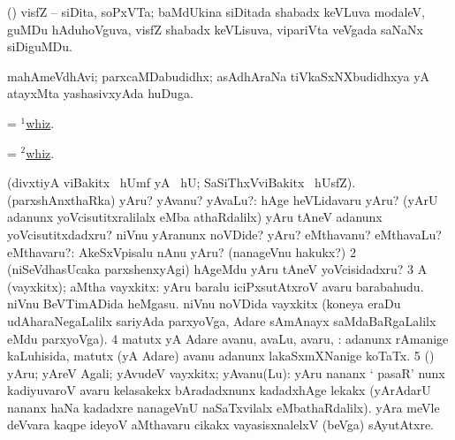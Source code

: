 \bentry
{}
\gl{\nA}
\bmng
(\AmA) visfZ -- siDita, soPxVTa; baMdUkina siDitada shabadx keVLuva modaleV, guMDu hAduhoVguva, visfZ shabadx keVLisuva, vipariVta veVgada saNaNx siDiguMDu. 
\emng
\eentry

\bentry
{}
\gl{\nA}
\bmng
mahAmeVdhAvi; parxcaMDabudidhx; asAdhAraNa tiVkaSxNXbudidhxya yA atayxMta yashasivxyAda huDuga. 
\emng
\eentry

\bentry
{} 
\gl{\nA}
\expl{}
\bmng
= \hyperlink{whiz(1)}{$^1$whiz}. 
\emng
\eentry

\bentry
{} 
\gl{\akirx}
\bmng
= \hyperlink{whiz(2)}{$^2$whiz}. 
\emng
\eentry

\bentry
{}
\gl{\saMkiSx}
\expl{}
\bmng
{} 
\emng
\eentry

\bentry
{} 
\gl{\sanA}
\expl{}
\bmng
(divxtiyA viBakitx  \ucAcx\ hUmf yA \AmA {} \ucAcx\ hU; SaSiThxVviBakitx  \ucAcx\ hUsfZ). 
\bnum
{} (parxshAnxthaRka) 
\banum
{} yAru? yAvanu? yAvaLu?:  hAge heVLidavaru yAru?  (yArU adanunx yoVcisutitxralilalx eMba athaRdalilx) yAru tAneV adanunx yoVcisutitxdadxru?    niVnu yAranunx noVDide? 
 yAru? eMthavanu? eMthavaLu? eMthavaru?:  AkeSxVpisalu nAnu yAru? (nanageVnu hakukx?) 
\eanum
\numie
\num{2} (niSeVdhasUcaka parxshenxyAgi)  hAgeMdu yAru tAneV yoVcisidadxru? 
\num{3} A (vayxkitx); aMtha vayxkitx:  yAru baralu iciPxsutAtxroV avaru barabahudu.  niVnu BeVTimADida heMgasu.  niVnu noVDida vayxkitx (koneya eraDu udAharaNegaLalilx  sariyAda parxyoVga, Adare sAmAnayx saMdaBaRgaLalilx  eMdu parxyoVga). 
\num{4} matutx yA Adare avanu, avaLu, avaru, \mo:  adanunx rAmanige kaLuhisida, matutx (yA Adare) avanu adanunx lakaSxmXNanige koTaTx. 
\num{5} (\pArxparx) yAru; yAreV Agali; yAvudeV vayxkitx; yAvanu(Lu):  yAru nananx ` pasaR' nunx kadiyuvaroV avaru kelasakekx bAradadxnunx kadadxhAge lekakx (yArAdarU nananx haNa kadadxre nanageVnU naSaTxvilalx eMbathaRdalilx).  yAra meVle deVvara kaqpe ideyoV aMthavaru cikakx vayasisxnalelxV (beVga) sAyutAtxre. 
\enum
\emng

